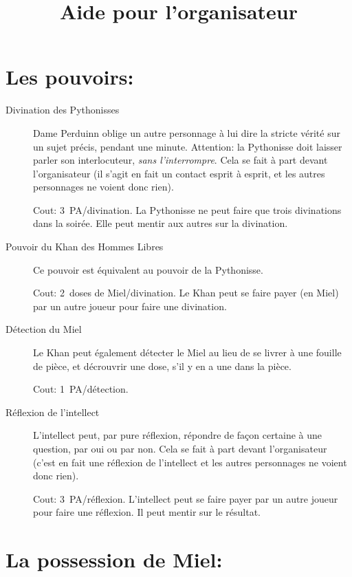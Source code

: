 \documentclass{article}
\title{Aide pour l'organisateur}
\date{}
\begin{document}
\maketitle

\section*{Les pouvoirs:}

\begin{description}
    \item[Divination des Pythonisses] Dame Perduinn oblige un autre personnage
        à lui dire la stricte vérité sur un sujet précis, pendant une minute.
        Attention: la Pythonisse doit laisser parler son interlocuteur,
        \emph{sans l'interrompre}.  Cela se fait à part devant l'organisateur
        (il s'agit en fait un contact esprit à esprit, et les autres
        personnages ne \og voient\fg{} donc rien).

        Cout: 3~PA/divination. La Pythonisse ne peut faire que trois
        divinations dans la soirée. Elle peut mentir aux autres sur la
        divination.

    \item[Pouvoir du Khan des Hommes Libres] Ce pouvoir est équivalent au
        pouvoir de la Pythonisse.

        Cout: 2~doses de Miel/divination. Le Khan peut se faire payer (en
        Miel) par un autre joueur pour faire une divination.

    \item[Détection du Miel] Le Khan peut également \og détecter le Miel\fg{}
        au lieu de se livrer à une fouille de pièce, et décrouvrir une dose,
        s'il y en a une dans la pièce.

        Cout: 1~PA/détection.

    \item[Réflexion de l'intellect] L'intellect peut, par pure réflexion,
        répondre de façon certaine à une question, par oui ou par non. Cela se
        fait à part devant l'organisateur (c'est en fait une réflexion de
        l'intellect et les autres personnages ne \og voient\fg{} donc rien).

        Cout: 3~PA/réflexion. L'intellect peut se faire payer par un autre
        joueur pour faire une réflexion. Il peut mentir sur le résultat.

\end{description}

\section*{La possession de Miel:}
\end{document}
